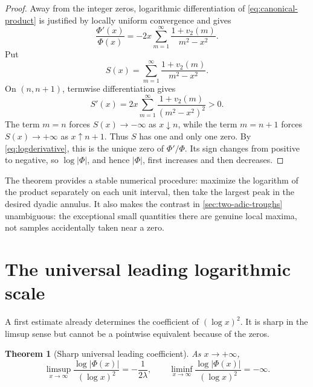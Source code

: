 \documentclass[11pt,oneside]{article}
\newtheorem{theorem}{Theorem}[section]
\theoremstyle{definition}
\theoremstyle{remark}
\newcommand{\vtwo}{v_2}
\newcommand{\PhiF}{\Phi}
\begin{document}
\begin{proof}
Away from the integer zeros, logarithmic differentiation of
\eqref{eq:canonical-product} is justified by locally uniform convergence and
gives
\begin{equation}
 \frac{\PhiF'(x)}{\PhiF(x)}
 =-2x\sum_{m=1}^{\infty}
 \frac{1+\vtwo(m)}{m^2-x^2}.
 \label{eq:logderivative}
\end{equation}
Put
\[
 S(x)=\sum_{m=1}^{\infty}
 \frac{1+\vtwo(m)}{m^2-x^2}.
\]
On \((n,n+1)\), termwise differentiation gives
\[
 S'(x)=2x\sum_{m=1}^{\infty}
 \frac{1+\vtwo(m)}{(m^2-x^2)^2}>0.
\]
The term \(m=n\) forces \(S(x)\to-\infty\) as \(x\downarrow n\), while
the term \(m=n+1\) forces \(S(x)\to+\infty\) as \(x\uparrow n+1\).
Thus \(S\) has one and only one zero.  By \eqref{eq:logderivative}, this is
the unique zero of \(\PhiF'/\PhiF\).  Its sign changes from positive to
negative, so \(\log|\PhiF|\), and hence \(|\PhiF|\), first increases and then
decreases.
\end{proof}

The theorem provides a stable numerical procedure: maximize the logarithm of
the product separately on each unit interval, then take the largest peak in
the desired dyadic annulus.  It also makes the contrast in
\cref{sec:two-adic-troughs} unambiguous: the exceptional small quantities
there are genuine local maxima, not samples accidentally taken near a zero.

\section{The universal leading logarithmic scale}
\label{sec:universal}

A first estimate already determines the coefficient of \((\log x)^2\).
It is sharp in the limsup sense but cannot be a pointwise equivalent because
of the zeros.

\begin{theorem}[Sharp universal leading coefficient]
\label{thm:universal-leading}
As \(x\to+\infty\),
\begin{equation}
 \limsup_{x\to\infty}
 \frac{\log|\PhiF(x)|}{(\log x)^2}
 =-\frac{1}{2\lambda},
 \qquad
 \liminf_{x\to\infty}
 \frac{\log|\PhiF(x)|}{(\log x)^2}=-\infty.
 \label{eq:limsup-leading}
\end{equation}
\end{theorem}
\end{document}
